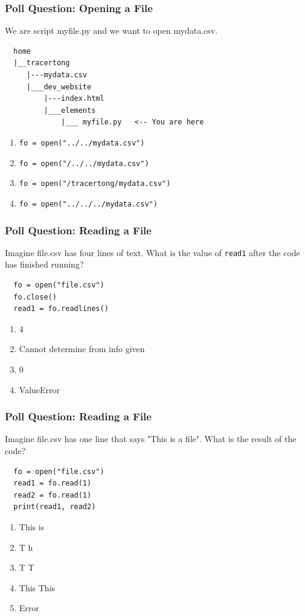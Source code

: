 \documentclass{beamer}
\begin{document}
%
%
\begin{frame}[fragile]
  \frametitle{Poll Question: Opening a File}
  We are script myfile.py and we want to open mydata.csv.
  \begin{lstlisting}
  home
  |__tracertong
     |---mydata.csv
     |___dev_website
         |---index.html
         |___elements
             |___ myfile.py   <-- You are here
  \end{lstlisting} 
  \vfill
  \begin{enumerate}[A]
    \item \lstinline|fo = open("../../mydata.csv")|
    \item \lstinline|fo = open("/../../mydata.csv")|
    \item \lstinline|fo = open("/tracertong/mydata.csv")|
    \item \lstinline|fo = open("../../../mydata.csv")|
  \end{enumerate}
\end{frame}

%
%
\begin{frame}[fragile]
  \frametitle{Poll Question: Reading a File}
  Imagine file.csv has four lines of text. What is the value of \lstinline|read1| after the code has finished running?
  \begin{lstlisting}
  fo = open("file.csv")
  fo.close()
  read1 = fo.readlines()
  \end{lstlisting} 
  \vfill
  \begin{enumerate}[A]
    \item 4
    \item Cannot determine from info given
    \item 0
    \item ValueError
  \end{enumerate}
\end{frame}


%
%
\begin{frame}[fragile]
  \frametitle{Poll Question: Reading a File}
  Imagine file.csv has one line that says "This is a file". What is the result of the code?
  \begin{lstlisting}
  fo = open("file.csv")
  read1 = fo.read(1)
  read2 = fo.read(1)
  print(read1, read2)
  \end{lstlisting} 
  \vfill
  \begin{enumerate}[A]
    \item This is
    \item T h
    \item T T
    \item This This
    \item Error
  \end{enumerate}
\end{frame}
\end{document}

